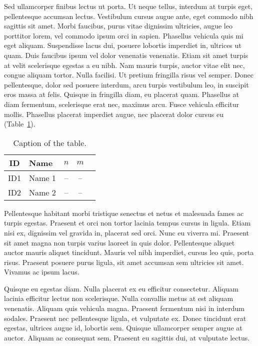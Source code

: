\documentclass[final,5p,times,twocolumn]{elsarticle}
\begin{document}
Sed ullamcorper finibus lectus ut porta. Ut neque tellus, interdum at turpis eget, pellentesque accumsan lectus. Vestibulum cursus augue ante, eget commodo nibh sagittis sit amet. Morbi faucibus, purus vitae dignissim ultricies, augue leo porttitor lorem, vel commodo ipsum orci in sapien. Phasellus vehicula quis mi eget aliquam. Suspendisse lacus dui, posuere lobortis imperdiet in, ultrices ut quam. Duis faucibus ipsum vel dolor venenatis venenatis. Etiam sit amet turpis at velit scelerisque egestas a eu nibh. Nam mauris turpis, auctor vitae elit nec, congue aliquam tortor. Nulla facilisi. Ut pretium fringilla risus vel semper. Donec pellentesque, dolor sed posuere interdum, arcu turpis vestibulum leo, in suscipit eros massa at felis. Quisque in fringilla diam, eu placerat quam. Phasellus at diam fermentum, scelerisque erat nec, maximus arcu. Fusce vehicula efficitur mollis. Phasellus placerat imperdiet augue, nec placerat dolor cursus eu (Table~\ref{tbl:d}).

\begin{table}[!ht]
    \centering
    \begin{adjustbox}{max width=\linewidth}
    \begin{tabular}{clccp{30ex}} 
    \toprule
        ID & Name & $n$ & $m$ \\ 
    \midrule
        ID1 & Name 1 & -- & -- \\
        ID2 & Name 2 & -- & -- \\
    \bottomrule
    \end{tabular}
    \end{adjustbox}
    \caption{Caption of the table.}
    \label{tbl:d}
\end{table}

Pellentesque habitant morbi tristique senectus et netus et malesuada fames ac turpis egestas. Praesent et orci non tortor lacinia tempus cursus in ligula. Etiam nisi ex, dignissim vel gravida in, placerat sed orci. Nunc eu viverra mi. Praesent sit amet magna non turpis varius laoreet in quis dolor. Pellentesque aliquet auctor mauris aliquet tincidunt. Mauris vel nibh imperdiet, cursus leo quis, porta risus. Praesent posuere purus ligula, sit amet accumsan sem ultricies sit amet. Vivamus ac ipsum lacus.

Quisque eu egestas diam. Nulla placerat ex eu efficitur consectetur. Aliquam lacinia efficitur lectus non scelerisque. Nulla convallis metus at est aliquam venenatis. Aliquam quis vehicula magna. Praesent fermentum nisi in interdum sodales. Praesent nec pellentesque ligula, et vulputate ex. Donec tincidunt erat egestas, ultrices augue id, lobortis sem. Quisque ullamcorper semper augue at auctor. Aliquam ac consequat sem. Praesent eu sagittis dui, at vulputate lectus.
\end{document}
